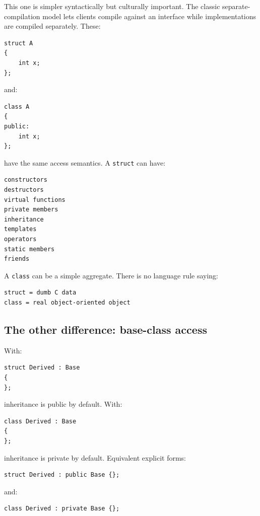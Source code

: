 This one is simpler syntactically but culturally important. The classic separate-compilation model lets clients compile against an interface while implementations are compiled separately. These:

\begin{verbatim}
struct A
{
    int x;
};
\end{verbatim}

and:

\begin{verbatim}
class A
{
public:
    int x;
};
\end{verbatim}

have the same access semantics. A \texttt{struct} can have:

\begin{verbatim}
constructors
destructors
virtual functions
private members
inheritance
templates
operators
static members
friends
\end{verbatim}

A \texttt{class} can be a simple aggregate. There is no language rule saying:

\begin{verbatim}
struct = dumb C data
class = real object-oriented object
\end{verbatim}

\subsection{The other difference: base-class access}\label{05-engine-i-ch003-the-other-difference-base-class-access}

With:

\begin{verbatim}
struct Derived : Base
{
};
\end{verbatim}

inheritance is public by default. With:

\begin{verbatim}
class Derived : Base
{
};
\end{verbatim}

inheritance is private by default. Equivalent explicit forms:

\begin{verbatim}
struct Derived : public Base {};
\end{verbatim}

and:

\begin{verbatim}
class Derived : private Base {};
\end{verbatim}

